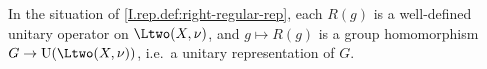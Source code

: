 In the situation of \cref{I.rep.def:right-regular-rep}, each $R(g)$ is a well-defined unitary operator on
$\Ltwo(X,\nu)$, and $g\mapsto R(g)$ is a group homomorphism $G\to\mathrm U(\Ltwo(X,\nu))$, i.e.\ a unitary representation
of $G$.
